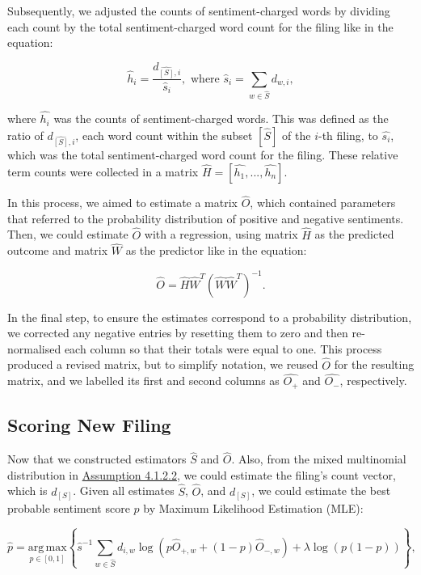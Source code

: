 \documentclass[logo,bsc,singlespacing,parskip]{infthesis}
\begin{document}
Subsequently, we adjusted the counts of sentiment-charged words by dividing each count by the total sentiment-charged word count for the filing like in the equation:

\begin{equation} \label{4.7}
\hat{h}_i = \frac{d_{\hat{[S]}, i}}{\hat{s}_i}, \text{ where } \hat{s}_i = \sum_{w \in \hat{S}} d_{w,i},
\end{equation}

where $\hat{h_i}$ was the counts of sentiment-charged words. This was defined as the ratio of $d_{\hat{[S]}, i}$, each word count within the subset $[\hat{S}]$ of the $i$-th filing, to $\hat{s_i}$, which was the total sentiment-charged word count for the filing. These relative term counts were collected in a matrix $\hat{H} = [\hat{h_1},...,\hat{h_n}]  $. 

In this process, we aimed to estimate a matrix $\hat{O}$, which contained parameters that referred to the probability distribution of positive and negative sentiments. Then, we could estimate $\hat{O}$ with a regression, using matrix $\hat{H}$ as the predicted outcome and matrix $\hat{W}$ as the predictor like in the equation:

\begin{equation} \label{4.8}
\hat{O} = \hat{H}\hat{W}^T (\hat{W}\hat{W}^T)^{-1}.
\end{equation}

In the final step, to ensure the estimates correspond to a probability distribution, we corrected any negative entries by resetting them to zero and then re-normalised each column so that their totals were equal to one. This process produced a revised matrix, but to simplify notation, we reused $\hat{O}$ for the resulting matrix, and we labelled its first and second columns as $\hat{O_+}$ and $ \hat{O_-}$, respectively. 

\subsection{Scoring New Filing}
\label{subsec:new_filings}
Now that we constructed estimators $\hat{S}$  and $\hat{O}$. Also, from the mixed multinomial distribution in \hyperref[subsubsec:assumption2]{Assumption 4.1.2.2}, we could estimate the filing’s count vector, which is $d_{[S]}$. Given all estimates $\hat{S}$, $\hat{O}$, and $d_{[S]}$, we could estimate the best probable sentiment score $p$ by Maximum Likelihood Estimation (MLE):

\begin{equation} \label{4.9}
\hat{p} = \underset{p \in [0,1]}{\mathrm{arg\,max}} \left\{ \hat{s}^{-1} \sum_{w \in \hat{S}} d_{i,w} \log ({p}\hat{O}_{+,w} + (1 - p)\hat{O}_{-,w}) + \lambda \log(p(1 - p)) \right\},
\end{equation}
\end{document}
